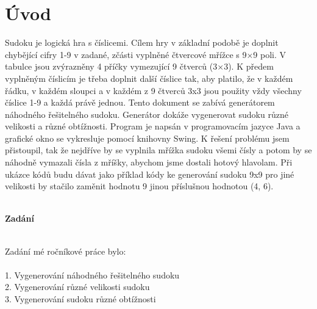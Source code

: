 \chapter{Úvod}
Sudoku je logická hra s číslicemi. Cílem hry v základní podobě je doplnit chybějící cifry 1-9 v zadané, zčásti vyplněné čtvercové mřížce s 9×9 poli. V tabulce jsou zvýrazněny 4 příčky vymezující 9 čtverců (3×3). K předem vyplněným číslicím je třeba doplnit další číslice tak, aby platilo, že v každém řádku, v každém sloupci a v každém z 9 čtverců 3x3 jsou použity vždy všechny číslice 1-9 a každá právě jednou. Tento dokument se zabívá generátorem náhodného řešitelného sudoku. Generátor dokáže vygenerovat sudoku různé velikosti a různé obtížnosti. Program je napsán v programovacím jazyce Java a grafické okno se vykresluje pomocí knihovny Swing. K řešení problému jsem přistoupil, tak že nejdříve by se vyplnila mřížka sudoku všemi čísly a potom by se náhodně vymazali čísla z mříšky, abychom jsme dostali hotový hlavolam. Při ukázce kódů budu dávat jako příklad kódy ke generování sudoku 9x9 pro jiné velikosti by stačilo zaměnit hodnotu 9 jinou příslušnou hodnotou (4, 6).\\
\\
\begin{Large}
\textbf{Zadání}\\
\\
\end{Large}
Zadání mé ročníkové práce bylo:\\
\\
1. Vygenerování náhodného řešitelného sudoku\\
2. Vygenerování různé velikosti sudoku\\
3. Vygenerování sudoku různé obtížnosti